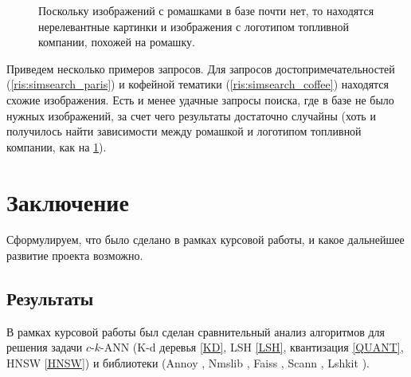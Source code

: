 \documentclass[a4paper,12pt]{extarticle}
\begin{document}
\begin{center}  
\begin{figure}[H]
\caption{Поскольку изображений с ромашками в базе почти нет, то находятся нерелевантные картинки и изображения с логотипом топливной компании, похожей на ромашку.}
\label{ris:simsearch_daisy}
\end{figure}
\end{center}

Приведем несколько примеров запросов. Для запросов достопримечательностей (\cref{ris:simsearch_paris}) и кофейной тематики (\cref{ris:simsearch_coffee}) находятся схожие изображения. Есть и менее удачные запросы поиска, где в базе не было нужных изображений, за счет чего результаты достаточно случайны (хоть и получилось найти зависимости между ромашкой и логотипом топливной компании, как на \cref{ris:simsearch_daisy}). 


\newpage

\section {Заключение}

Сформулируем, что было сделано в рамках курсовой работы, и какое дальнейшее развитие проекта возможно.

\subsection{Результаты}

В рамках курсовой работы был сделан сравнительный анализ алгоритмов для решения задачи $c$-$k$-ANN (K-d деревья \ref{KD}, LSH \ref{LSH}, квантизация \ref{QUANT}, HNSW \ref{HNSW}) и библиотеки (Annoy \cite{Github:annoy}, Nmslib \cite{Github:nmslib}, Faiss \cite{Github:faiss}, Scann \cite{Github:scann}, Lshkit \cite{lshkit}).
\end{document}
